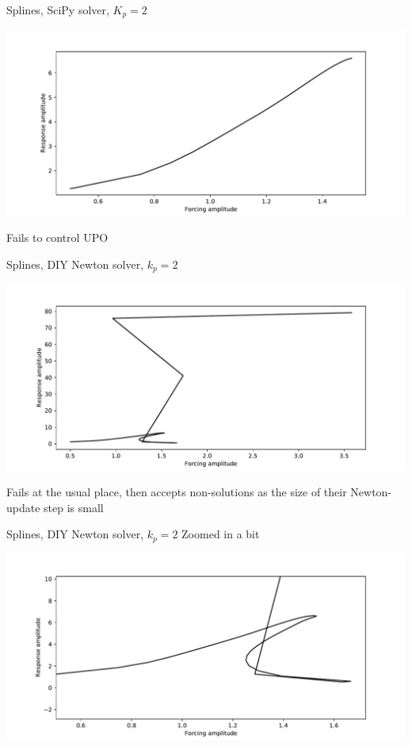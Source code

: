 \documentclass[presentation]{beamer}
\begin{document}
\begin{frame}[label={sec:org5c78395}]{Splines, SciPy solver, \(K_p=2\)}
\begin{center}
\includegraphics[width=.9\linewidth]{./kp2_transtime100_scipy.pdf}
\end{center}

Fails to control UPO
\end{frame}

\begin{frame}[label={sec:org23197a1}]{Splines, DIY Newton solver, \(k_p=2\)}
\begin{center}
\includegraphics[width=.9\linewidth]{./kp2_transtime100_newton.pdf}
\end{center}

Fails at the usual place, then accepts non-solutions as the size of their Newton-update step is small
\end{frame}

\begin{frame}[label={sec:org721d969}]{Splines, DIY Newton solver, \(k_p=2\)}
\alert{Zoomed in a bit}
\begin{center}
\includegraphics[width=.9\linewidth]{./kp2_transtime100_newton_zoom.pdf}
\end{center}
\end{frame}
\end{document}
